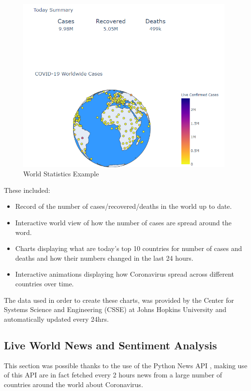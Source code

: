 \begin{figure}[ht!]%
    \centering
    \includegraphics[width=11cm]{latex/images/world.PNG}%
    \caption{World Statistics Example}
    \label{world}
\end{figure}

These included:

\begin{itemize}
    \setlength\itemsep{-0.3cm}
    \item Record of the number of cases/recovered/deaths in the world up to date.
    \item Interactive world view of how the number of cases are spread around the word.
    \item Charts displaying what are today's top 10 countries for number of cases and deaths and how their numbers changed in the last 24 hours.
    \item Interactive animations displaying how Coronavirus spread across different countries over time.
\end{itemize}

The data used in order to create these charts, was provided by the Center for Systems Science and Engineering (CSSE) at Johns Hopkins University \cite{world_data} and automatically updated every 24hrs.

\subsection{Live World News and Sentiment Analysis}

This section was possible thanks to the use of the Python News API \cite{news}, making use of this API are in fact fetched every 2 hours news from a large number of countries around the world about Coronavirus. 

